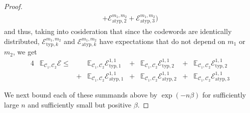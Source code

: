 \documentclass[journal]{IEEEtran}
\newcommand{\codebookOne}{\mathcal{C}_1}
\newcommand{\codebookTwo}{\mathcal{C}_2}
\newcommand{\codewordIndex}{m}
\newcommand{\codebookBlocklength}{n}
\newcommand{\proofconstantOne}{{\beta}}
\newcommand{\Expectation}{\mathbb{E}}
\newcommand{\errorprob}{\mathcal{E}}
\newcommand{\indexForTypicalSet}{k}
\begin{document}
\begin{proof}
\begin{align*}
\begin{aligned}
      +
      \errorprob_{\mathrm{atyp},2}^{\codewordIndex_1, \codewordIndex_2}
      +
      \errorprob_{\mathrm{atyp},3}^{\codewordIndex_1, \codewordIndex_2}
    \Big)
  \end{aligned}
\end{align*}
and thus, taking into cosideration that since the codewords are identically distributed, $\errorprob_{\text{typ},\indexForTypicalSet}^{\codewordIndex_1, \codewordIndex_2}$ and $\errorprob_{\text{atyp},\indexForTypicalSet}^{\codewordIndex_1, \codewordIndex_2}$ have expectations that do not depend on $\codewordIndex_1$ or $\codewordIndex_2$, we get
\begin{alignat*}{4}
&\Expectation_{\codebookOne, \codebookTwo} \errorprob
\leq
&~&
\Expectation_{\codebookOne, \codebookTwo} \errorprob_{\mathrm{typ},1}^{1,1}
&+&
\Expectation_{\codebookOne, \codebookTwo} \errorprob_{\mathrm{typ},2}^{1,1}
&+&
\Expectation_{\codebookOne, \codebookTwo} \errorprob_{\mathrm{typ},2}^{1,1}
\\
&~
&+&
\Expectation_{\codebookOne, \codebookTwo} \errorprob_{\mathrm{atyp},1}^{1,1}
&+&
\Expectation_{\codebookOne, \codebookTwo} \errorprob_{\mathrm{atyp},2}^{1,1}
&+&
\Expectation_{\codebookOne, \codebookTwo} \errorprob_{\mathrm{atyp},3}^{1,1}
\end{alignat*}

We next bound each of these summands above by $\exp(-\codebookBlocklength\proofconstantOne)$ for sufficiently large $\codebookBlocklength$ and sufficiently small but positive $\proofconstantOne$.


\end{proof}
\end{document}
